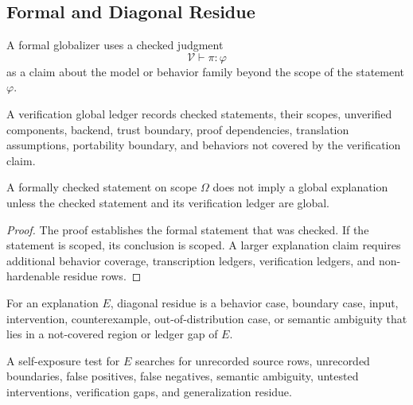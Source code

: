 \subsection{Formal and Diagonal Residue}
\label{subsec:philosophy-formal-diagonal-residue}

\begin{definition}
\label{def:philosophy-formal-globalizer}
A formal globalizer uses a checked judgment
$$
\mathcal V\vdash\pi:\varphi
$$
as a claim about the model or behavior family beyond the scope of the
statement $\varphi$.
\end{definition}

\begin{definition}
\label{def:philosophy-verification-global-ledger}
A verification global ledger records checked statements, their scopes,
unverified components, backend, trust boundary, proof dependencies,
translation assumptions, portability boundary, and behaviors not covered
by the verification claim.
\end{definition}

\begin{theorem}
\label{thm:philosophy-scoped-proof-not-global-explanation}
A formally checked statement on scope $\Omega$ does not imply a global
explanation unless the checked statement and its verification ledger are
global.
\end{theorem}
\begin{proof}
The proof establishes the formal statement that was checked. If the
statement is scoped, its conclusion is scoped. A larger explanation
claim requires additional behavior coverage, transcription ledgers,
verification ledgers, and non-hardenable residue rows.
\end{proof}

\begin{definition}
\label{def:philosophy-diagonal-residue}
For an explanation $E$, diagonal residue is a behavior case, boundary
case, input, intervention, counterexample, out-of-distribution case, or
semantic ambiguity that lies in a not-covered region or ledger gap of
$E$.
\end{definition}

\begin{definition}
\label{def:philosophy-self-exposure-test}
A self-exposure test for $E$ searches for unrecorded source rows,
unrecorded boundaries, false positives, false negatives, semantic
ambiguity, untested interventions, verification gaps, and generalization
residue.
\end{definition}

